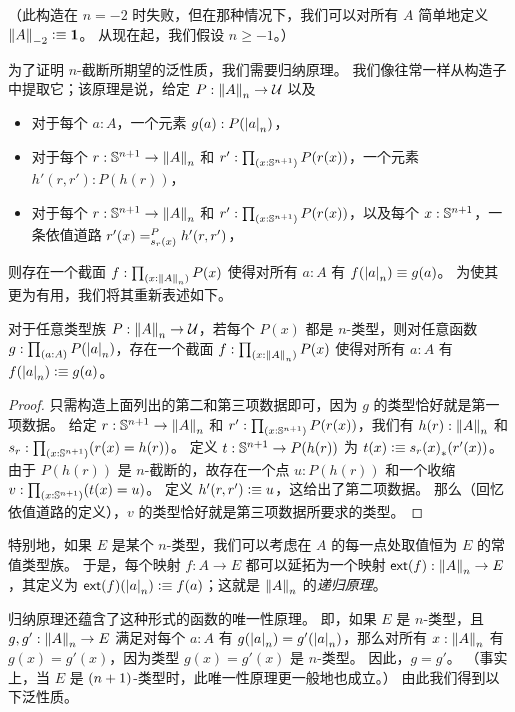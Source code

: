 （此构造在 $n=-2$ 时失败，但在那种情况下，我们可以对所有 $A$ 简单地定义 $\trunc{-2}{A}\defeq \unit$。
从现在起，我们假设 $n\ge -1$。）

%
为了证明 $n$-截断所期望的泛性质，我们需要归纳原理。
我们像往常一样从构造子中提取它；该原理是说，给定 $P:\trunc nA\to\type$ 以及


\begin{itemize}
\item 对于每个 $a:A$，一个元素 $g(a) : P(\tproj na)$，
\item 对于每个 $r:\Sn^{n+1} \to \trunc n A$ 和 $r':\prd{x:\Sn^{n+1}} P(r(x))$，一个元素 $h'(r,r'):P(h(r))$，
\item 对于每个 $r:\Sn^{n+1} \to \trunc n A$ 和 $r':\prd{x:\Sn^{n+1}} P(r(x))$，以及每个 $x:\Sn^{n+1}$，一条依值道路
$\dpath{P}{s_r(x)}{r'(x)}{h'(r,r')}$，
\end{itemize}


则存在一个截面 $f:\prd{x:\trunc n A} P(x)$ 使得对所有 $a:A$ 有 $f(\tproj n a) \jdeq g(a)$。
为使其更为有用，我们将其重新表述如下。

\begin{thm}\label{thm:truncn-ind}
  对于任意类型族 $P:\trunc n A \to \type$，若每个 $P(x)$ 都是 $n$-类型，则对任意函数 $g : \prd{a:A} P(\tproj n a)$，存在一个截面 $f:\prd{x:\trunc n A} P(x)$ 使得对所有 $a:A$ 有 $f(\tproj n a)\defeq g(a)$。
\end{thm}

\begin{proof}
  只需构造上面列出的第二和第三项数据即可，因为 $g$ 的类型恰好就是第一项数据。
  给定 $r:\Sn^{n+1} \to \trunc n A$ 和 $r':\prd{x:\Sn^{n+1}} P(r(x))$，我们有 $h(r):\trunc n A$ 和 $s_r :\prd{x:\Sn^{n+1}} (r(x) =
h(r))$。
  定义 $t:\Sn^{n+1} \to P(h(r))$ 为 $t(x) \defeq \trans{s_r(x)}{r'(x)}$。
  由于 $P(h(r))$ 是 $n$-截断的，故存在一个点 $u:P(h(r))$ 和一个收缩 $v:\prd{x:\Sn^{n+1}} (t(x) = u)$。
  定义 $h'(r,r') \defeq u$，这给出了第二项数据。
  那么（回忆依值道路的定义），$v$ 的类型恰好就是第三项数据所要求的类型。
\end{proof}

特别地，如果 $E$ 是某个 $n$-类型，我们可以考虑在 $A$ 的每一点处取值恒为 $E$ 的常值类型族。
%
于是，每个映射 $f:A\to{}E$ 都可以延拓为一个映射 $\extend{f}:\trunc nA\to{}E$，其定义为 $\extend{f}(\tproj na)\defeq f(a)$；这就是 $\trunc n A$ 的\emph{递归原理}。

归纳原理还蕴含了这种形式的函数的唯一性原理。
%
即，如果 $E$ 是 $n$-类型，且 $g,g':\trunc nA\to{}E$ 满足对每个 $a:A$ 有 $g(\tproj na)=g'(\tproj na)$，那么对所有 $x:\trunc nA$ 有 $g(x)=g'(x)$，因为类型 $g(x)=g'(x)$ 是 $n$-类型。
因此，$g=g'$。
（事实上，当 $E$ 是 $\nplusone$-类型时，此唯一性原理更一般地也成立。）
由此我们得到以下泛性质。

